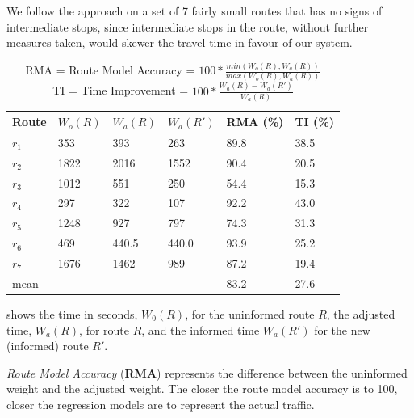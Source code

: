 We follow the approach on a set of 7 fairly small routes that has no signs of intermediate stops, since intermediate stops in the route, without further measures taken, would skewer the travel time in favour of our system. 
\begin{table}[]
\centering
\begin{tabular}{llllll}
\textbf{Route} & \textbf{$W_o(R)$} & \textbf{$W_a(R)$}  & \textbf{$W_a(R')$} & \textbf{RMA (\%)} & \textbf{TI (\%)} \\ \hline
$r_1$          & 353               & 393                & 263                & 89.8                         & 38.5 \\
$r_2$          & 1822              & 2016               & 1552               & 90.4                         & 20.5 \\
$r_3$          & 1012              & 551                & 250                & 54.4                         & 15.3 \\
$r_4$          & 297               & 322                & 107                & 92.2                         & 43.0 \\
$r_5$          & 1248              & 927                & 797                & 74.3                         & 31.3 \\
$r_6$          & 469               & 440.5              & 440.0              & 93.9                         & 25.2 \\
$r_7$          & 1676              & 1462               & 989                & 87.2                         & 19.4 \\ \hline
mean       	   &                   &                    &                    & 83.2                         & 27.6
\end{tabular}
\caption{RMA = Route Model Accuracy = $100 * \frac{min(W_o(R), W_a(R))}{max(W_o(R), W_a(R))}$\\
	     TI = Time Improvement = $100 * \frac{W_a(R) - W_a(R')}{W_a(R)}$}
\label{tab:eval-results}
\end{table}

 shows the time in seconds, $W_0(R)$, for the uninformed route $R$, the adjusted time, $W_a(R)$, for route $R$, and the informed time $W_a(R')$ for the new (informed) route $R'$.

\emph{Route Model Accuracy } (\textbf{RMA}) represents the difference between the uninformed weight and the adjusted weight. The closer the route model accuracy is to 100, closer the regression models are to represent the actual traffic.
 
